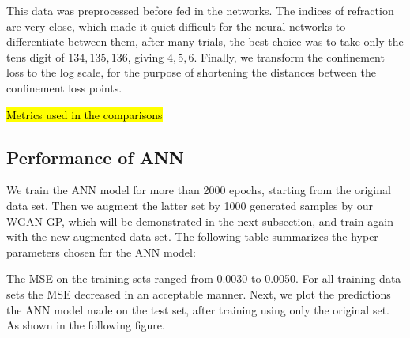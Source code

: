 \documentclass[draft, 10pt]{IEEEtran}
\begin{document}
This data was preprocessed before fed in the networks. The indices of refraction  are very close, which made it quiet difficult for the neural networks to differentiate between them, after many trials, the best choice was to take only the tens digit of ${134, 135, 136}$, giving ${4, 5, 6}$. Finally, we transform the confinement loss to the log scale, for the purpose of shortening the distances between the confinement loss points.

\hl{Metrics used in the comparisons}


\subsection{Performance of ANN}

We train the ANN model for more than 2000 epochs, starting from the original data set. Then we augment the latter set by 1000 generated samples by our WGAN-GP, which will be demonstrated in the next subsection, and train again with the new augmented data set. The following table summarizes the hyper-parameters chosen for the ANN model:
\begin{table}[h]
\centering
{}
\caption{Hyper-parameters chosen for the ANN model, where $\beta_{1}$ and $\beta_{2}$ are a part of Adam parameters}
\end{table}

\newpage
The MSE on the training sets ranged from 0.0030 to 0.0050. For all training data sets the MSE decreased in an acceptable manner. Next, we plot the predictions the ANN model made on the test set, after training using only the original set. As shown in the following figure.
\end{document}
